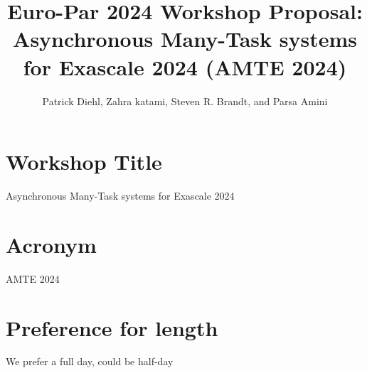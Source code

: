 \documentclass{article}
\title{Euro-Par 2024 Workshop Proposal: Asynchronous Many-Task systems for Exascale 2024 (AMTE 2024)
}
\author{Patrick Diehl, Zahra katami, Steven R. Brandt, and Parsa Amini }
\begin{document}
\maketitle

\section*{Workshop Title}
Asynchronous Many-Task systems for Exascale 2024
\section*{Acronym}
AMTE 2024

\section*{Preference for length}
We prefer a full day, could be half-day
\end{document}
